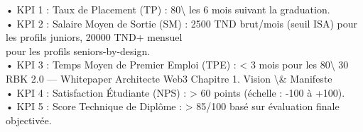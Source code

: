 \documentclass[12pt,landscape,a4paper]{article}
\begin{document}
• KPI 1 : Taux de Placement (TP) : 80\textbackslash{}%
les 6 mois suivant la graduation.\\
\vspace{0.5em}
• KPI 2 : Salaire Moyen de Sortie (SM) : 2500 TND brut/mois (seuil ISA) pour les profils juniors, 20000 TND+ mensuel\\
pour les profils seniors-by-design.\\
\vspace{0.5em}
• KPI 3 : Temps Moyen de Premier Emploi (TPE) : \textless{} 3 mois pour les 80\textbackslash{}%
\vspace{0.5em}
\vspace{0.5em}
\vspace{0.5em}
\vspace{0.5em}
30\\
RBK 2.0 — Whitepaper Architecte Web3                                                                         Chapitre 1. Vision \textbackslash{}& Manifeste\\
\vspace{0.5em}
\vspace{0.5em}
\vspace{0.5em}
• KPI 4 : Satisfaction Étudiante (NPS) : \textgreater{} 60 points (échelle : -100 à +100).\\
\vspace{0.5em}
• KPI 5 : Score Technique de Diplôme : \textgreater{} 85/100 basé sur évaluation finale objectivée.\\
\vspace{0.5em}
\vspace{0.5em}
\end{document}
